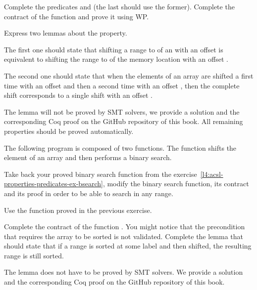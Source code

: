 

Complete the predicates  and  (the
last should use the former). Complete the contract of the
 function and prove it using WP.


Express two lemmas about the  property.


The first one  should state that shifting a range
 to  of an  with an
offset  is equivalent to shifting the range  to
 of the memory location  with an offset
.



The second one should state that when the elements of an array are shifted a
first time with an offset  and then a second time with an offset
, then the complete shift corresponds to a single shift with an
offset .



The lemma  will not be proved by SMT solvers, we provide
a solution and the corresponding Coq proof on the GitHub repository of this
book. All remaining properties should be proved automatically.





The following program is composed of two functions. The function
 shifts the element of an array and then
performs a binary search.




Take back your proved binary search function from the
exercise~\ref{l4:acsl-properties-predicates-ex-bsearch}, modify the binary
search function, its contract and its proof in order to be able to search in
any range.


Use the  function proved in the previous exercise.


Complete the contract of the function . You might
notice that the precondition that requires the array to be sorted is not
validated. Complete the lemma  that should
state that if a range is sorted at some label and then shifted, the resulting
range is still sorted.

The lemma does not have to be proved by SMT solvers. We provide a solution and
the corresponding Coq proof on the GitHub repository of this book.
